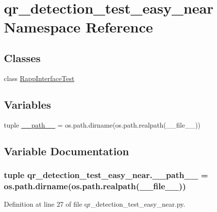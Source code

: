 \hypertarget{namespaceqr__detection__test__easy__near}{\section{qr\-\_\-detection\-\_\-test\-\_\-easy\-\_\-near Namespace Reference}
\label{namespaceqr__detection__test__easy__near}
}
\subsection*{Classes}
\begin{DoxyCompactItemize}
\item 
class \hyperlink{classqr__detection__test__easy__near_1_1RappInterfaceTest}{Rapp\-Interface\-Test}
\end{DoxyCompactItemize}
\subsection*{Variables}
\begin{DoxyCompactItemize}
\item 
tuple \hyperlink{namespaceqr__detection__test__easy__near_a3ad85e3137b99cf63794139ab5f3f492}{\-\_\-\-\_\-path\-\_\-\-\_\-} = os.\-path.\-dirname(os.\-path.\-realpath(\-\_\-\-\_\-file\-\_\-\-\_\-))
\end{DoxyCompactItemize}


\subsection{Variable Documentation}
\hypertarget{namespaceqr__detection__test__easy__near_a3ad85e3137b99cf63794139ab5f3f492}{
\subsubsection[{\-\_\-\-\_\-path\-\_\-\-\_\-}]{\setlength{\rightskip}{0pt plus 5cm}tuple qr\-\_\-detection\-\_\-test\-\_\-easy\-\_\-near.\-\_\-\-\_\-path\-\_\-\-\_\- = os.\-path.\-dirname(os.\-path.\-realpath(\-\_\-\-\_\-file\-\_\-\-\_\-))}}\label{namespaceqr__detection__test__easy__near_a3ad85e3137b99cf63794139ab5f3f492}


Definition at line 27 of file qr\-\_\-detection\-\_\-test\-\_\-easy\-\_\-near.\-py.

